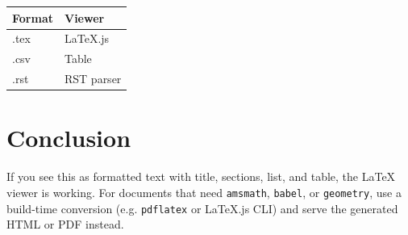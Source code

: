 \documentclass{article}
\begin{document}
\begin{center}
  \begin{tabular}{|l|l|}
    \hline
    Format & Viewer \\
    \hline
    .tex & LaTeX.js \\
    .csv & Table \\
    .rst & RST parser \\
    \hline
  \end{tabular}
\end{center}

\section{Conclusion}

If you see this as formatted text with title, sections, list, and table, the LaTeX viewer is working. For documents that need \texttt{amsmath}, \texttt{babel}, or \texttt{geometry}, use a build-time conversion (e.g. \texttt{pdflatex} or LaTeX.js CLI) and serve the generated HTML or PDF instead.
\end{document}
